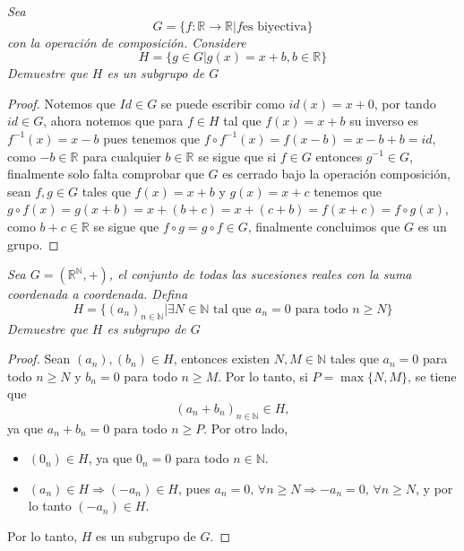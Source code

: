 \documentclass[11pt,letterpaper]{article}
\newcommand{\R}{\mathbb{R}}
\newcommand{\N}{\mathbb{N}}
\begin{document}
\begin{tcolorbox}[
	title = \textcolor{black}{\textcolor{white}{Problema 5}},]
\textit{Sea
\begin{equation*}
    G=\{f:\R\to \R|f\text{es biyectiva}\}
\end{equation*}
con la operaci\'on de composici\'on. Considere
\begin{equation*}
    H=\{g\in G|g(x)=x+b,b\in \R\}
\end{equation*}
Demuestre que $H$ es un subgrupo de $G$}
\end{tcolorbox}
\begin{proof}
    Notemos que $Id\in G$ se puede escribir como $id(x)=x+
    0$, por tando $id\in G$, ahora notemos que para $f\in H$ tal que $f(x)=x+b$ su inverso es
    $f^{-1}(x)=x-b$ pues tenemos que $f\circ f^{-1}(x)=f(x-b)=x-b+b=id$, como $-b\in \R$ para cualquier $b\in \R$ se sigue que
    si $f\in G$ entonces $g^{-1}\in G$, finalmente solo falta comprobar que $G$ es cerrado bajo la operaci\'on composici\'on, sean $f,g\in G$
    tales que  $f(x)=x+b$ y $g(x)=x+c$ tenemos que $g\circ f(x)=g(x+b)=x+(b+c)=x+(c+b)=f(x+c)=f\circ g(x)$, como $b+c\in \R$ se sigue que $f\circ g=g\circ f\in G$, finalmente
    concluimos que $G$ es un grupo. 
\end{proof}
\begin{tcolorbox}[
	title = \textcolor{black}{\textcolor{white}{Problema 6}},]
\textit{Sea $G=(\R^{\N},+)$, el conjunto de todas las sucesiones reales con la suma coordenada a coordenada. Defina
\begin{equation*}
    H=\{(a_n)_{n\in \N}|\exists N\in \N\,\,\text{tal que}\,\,a_n=0\,\,\text{para todo}\,\,n\geq N \}
\end{equation*}
Demuestre que $H$ es subgrupo de $G$}
\end{tcolorbox}
\begin{proof}
    Sean \((a_n),(b_n)\in H\), entonces existen \(N,M \in \N\) tales que \(a_n=0\) para todo \(n\geq N\) y \(b_n=0\) para todo \(n\geq M\). 
    Por lo tanto, si \(P=\max\{N,M\}\), se tiene que
    \[(a_n+b_n)_{n\in\N} \in H,\] 
    ya que \(a_n+b_n=0\) para todo \(n\geq P\). Por otro lado,
    \begin{itemize}
        \item \( (0_n) \in H\), ya que \(0_n=0\) para todo \(n\in\N\).
        \item \((a_n) \in H \Rightarrow (-a_n)\in H\), pues \(a_n=0,\, \forall n\geq N \Rightarrow -a_n=0,\, \forall n\geq N  \), y por lo tanto \((-a_n)\in H\).
    \end{itemize}
    Por lo tanto, \(H\) es un subgrupo de \(G\).
\end{proof}
\end{document}
